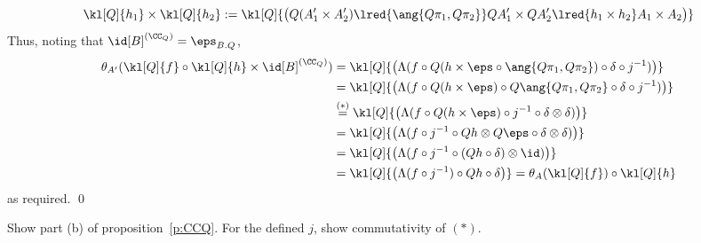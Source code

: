 \documentclass{svmult}
\begin{document}
\[ \kl[Q]{{h_1}}\times\kl[Q]{{h_2}}:=\kl[Q]{\big(Q(A'_1\times A'_2)\lred{\ang{Q\pi_1,Q\pi_2}}QA'_1\times QA'_2\lred{h_1\times h_2}A_1\times A_2\big)} \]
Thus, noting that $\id[B]^{(\CC_Q)}=\eps_{B.Q}$,
\begin{align*}
 \theta_{A'}(\kl[Q]{f}\circ\kl[Q]{h}\times\id[B]^{(\CC_Q)})
    &= \kl[Q]{\big(\Lambda(f\circ Q(h\times\eps\circ\ang{Q\pi_1,Q\pi_2})\circ\delta\circ j^{-1})\big)} \\
    &= \kl[Q]{\big(\Lambda(f\circ Q(h\times\eps)\circ Q\ang{Q\pi_1,Q\pi_2}\circ\delta\circ j^{-1})\big)} \\
    &\overset{(*)}{=} \kl[Q]{\big(\Lambda(f\circ Q(h\times\eps)\circ j^{-1}\circ\delta\otimes\delta)\big)} \\
    &= \kl[Q]{\big(\Lambda(f\circ j^{-1}\circ Qh\otimes Q\eps\circ\delta\otimes\delta)\big)} \\
    &= \kl[Q]{\big(\Lambda(f\circ j^{-1}\circ (Qh\circ\delta)\otimes\id)\big)} \\
    &= \kl[Q]{\big(\Lambda(f\circ j^{-1})\circ Qh\circ\delta\big)}=\theta_A(\kl[Q]{f})\circ\kl[Q]{h}
\end{align*}
as required. \qed
%

\begin{myexercise}
Show part (b) of proposition~\ref{p:CCQ}. For the defined $j$, show commutativity of $(*)$.
\end{myexercise}
\end{document}
